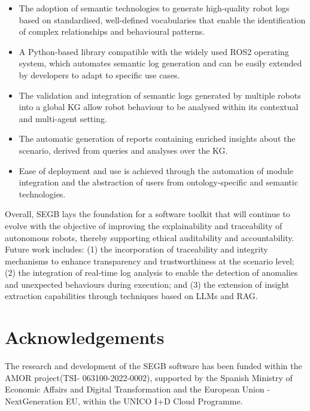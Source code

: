 \documentclass[preprint,12pt, a4paper]{elsarticle}
\begin{document}
\begin{itemize}
\item The adoption of semantic technologies to generate high-quality robot logs based on standardised, well-defined vocabularies that enable the identification of complex relationships and behavioural patterns.
\item A Python-based library compatible with the widely used ROS2 operating system, which automates semantic log generation and can be easily extended by developers to adapt to specific use cases.
\item The validation and integration of semantic logs generated by multiple robots into a global \ac{KG} allow robot behaviour to be analysed within its contextual and multi-agent setting.
\item The automatic generation of reports containing enriched insights about the scenario, derived from queries and analyses over the \ac{KG}.
\item Ease of deployment and use is achieved through the automation of module integration and the abstraction of users from ontology-specific and semantic technologies.
\end{itemize}

Overall, \ac{SEGB} lays the foundation for a software toolkit that will continue to evolve with the objective of improving the explainability and traceability of autonomous robots, thereby supporting ethical auditability and accountability. Future work includes: (1) the incorporation of traceability and integrity mechanisms to enhance transparency and trustworthiness at the scenario level; (2) the integration of real-time log analysis to enable the detection of anomalies and unexpected behaviours during execution; and (3) the extension of insight extraction capabilities through techniques based on \acp{LLM} and \ac{RAG}.




\section*{Acknowledgements}\label{acknowledgments}
The research and development of the \ac{SEGB} software has been funded within the AMOR project(TSI- 063100-2022-0002), supported by the Spanish Ministry of Economic Affairs and Digital Transformation and the European Union - NextGeneration EU, within the UNICO I+D Cloud Programme.





 

\end{document}
